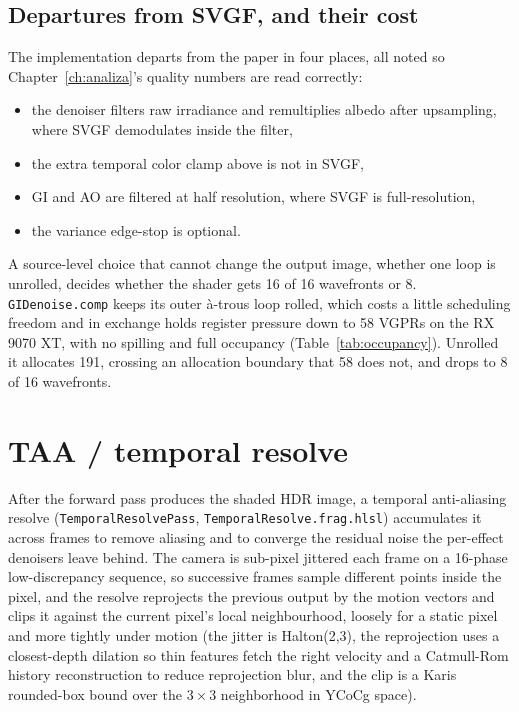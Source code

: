 \subsection{Departures from SVGF, and their cost}

The implementation departs from the paper in four places, all noted so Chapter~\ref{ch:analiza}'s
quality numbers are read correctly:
\begin{itemize}
\item the denoiser filters raw irradiance and remultiplies albedo after upsampling, where SVGF
      demodulates inside the filter,
\item the extra temporal color clamp above is not in SVGF,
\item GI and AO are filtered at half resolution, where SVGF is full-resolution,
\item the variance edge-stop is optional.
\end{itemize}

A source-level choice that cannot change the output image, whether one loop is unrolled, decides
whether the shader gets 16 of 16 wavefronts or 8. \texttt{GIDenoise.comp} keeps its outer \`a-trous
loop rolled, which costs a little scheduling freedom and in exchange holds register pressure down to
58 VGPRs on the RX 9070 XT, with no spilling and full occupancy (Table~\ref{tab:occupancy}).
Unrolled it allocates 191, crossing an allocation boundary that 58 does not, and drops to 8 of 16
wavefronts.

\section{TAA / temporal resolve}
\label{sec:taa}

After the forward pass produces the shaded HDR image, a temporal anti-aliasing resolve \cite{karis2014taa}
(\texttt{TemporalResolvePass}, \texttt{TemporalResolve.frag.hlsl}) accumulates it across frames to
remove aliasing and to converge the residual noise the per-effect denoisers leave behind. The camera
is sub-pixel jittered each frame on a 16-phase low-discrepancy sequence, so successive frames
sample different points inside the pixel, and the resolve reprojects the previous output by the motion
vectors and clips it against the current pixel's local neighbourhood, loosely for a static pixel and
more tightly under motion (the jitter is Halton(2,3), the reprojection uses a closest-depth dilation
so thin features fetch the right velocity and a Catmull-Rom history reconstruction to reduce
reprojection blur, and the clip is a Karis rounded-box bound over the $3\times3$ neighborhood in
YCoCg space).

